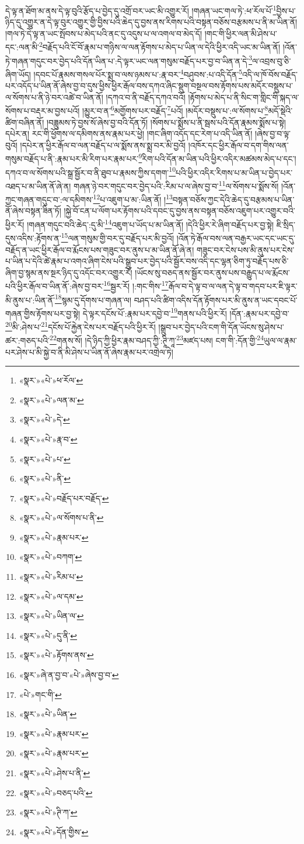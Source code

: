 དེ་ལྟ་ན་ཐོག་མ་ནས་དེ་ལྟ་བུའི་རྩོད་པ་བྱེད་དུ་འགྲོ་བར་ཡང་མི་འགྱུར་རོ། །གཞན་ཡང་གལ་ཏེ་:ཕ་རོལ་པོ་\footnote{«སྣར་»«པེ་»ཕ་རོལ་}བྱིས་པ་ཉིད་དུ་འགྱུར་ན་དེ་ལྟ་བུར་འགྱུར་གྱི་བྱིས་པའི་ཆེད་དུ་བྱས་ནས་རིགས་པའི་བསྟན་བཅོས་བརྩམས་པ་ནི་མ་ཡིན་ནོ། །གལ་ཏེ་དེ་ལྟ་ན་ཡང་སྤོབས་པ་མེད་པའི་ནང་དུ་འདུས་པ་ལ་འགལ་བ་མེད་དོ། །གང་གི་ཕྱིར་ལན་མི་ཤེས་པ་དང་:ལན་མི་\footnote{«སྣར་»«པེ་»ལན་མ་}བརྗོད་པའི་ངོ་བོ་རྣམ་པ་གཉིས་ལ་ལན་རྟོགས་པ་མེད་པ་ཡིན་ལ་དེའི་ཕྱིར་འདི་ཡང་མ་ཡིན་ནོ། །འོན་ཏེ་གཞན་གདུང་བར་བྱེད་པའི་དོན་ཡིན་པ་:དེ་ལྟར་ཡང་ལན་གསུམ་བརྗོད་པར་བྱ་བ་ཡིན་ན་དེ་\footnote{«སྣར་»«པེ་»དེ་}ལ་འབྲས་བུ་ཅི་ཞིག་ཡོད། །དབང་པོ་རྣམས་གསལ་པོར་སྨྲ་བ་ལས་ཉམས་པ་:རྣ་བར་\footnote{«སྣར་»«པེ་»རྣ་བ་}བཤུབས་:པ་འདི་དོན་\footnote{«སྣར་»«པེ་»པ་}འདི་ལ་ཁོ་བོས་བརྗོད་པར་འདོད་པ་ཡིན་ནོ་ཞེས་བྱ་བ་དུས་ཕྱིས་ཕྱིར་རྒོལ་བས་དཀའ་ཞིང་སྡུག་བསྔལ་བས་རྟོགས་པས་མདོར་བསྡུས་པ་ལ་སོགས་པ་ནི་ཉེ་བར་འཚེ་བ་ཡིན་ནོ། །དཀའ་བ་ནི་བརྗོད་དཀའ་བའོ། །རྟོགས་པ་མེད་པ་ནི་སིང་ག་གླིང་གི་སྐད་ལ་སོགས་པ་བརྡར་མ་བྱས་པའོ། །མྱུར་བ་ན་\footnote{«སྣར་»«པེ་»ནི་}མགྱོགས་པར་བརྗོད་\footnote{«སྣར་»«པེ་»བརྗོད་པར་བརྗོད་}པའོ། །མདོར་བསྡུས་པ་:ལ་སོགས་པ་\footnote{«སྣར་»«པེ་»ལ་སོགས་པ་ནི་}མདོ་སྡེའི་ཚིག་བཞིན་ནོ། །བཟླུམས་ཏེ་བྱས་སོ་ཞེས་བྱ་བའི་དོན་ཏོ། །སོགས་པ་སྨོས་པ་ནི་སྦས་པའི་དོན་རྣམས་སྨོས་པ་སྟེ། དཔེར་ན། རང་གི་ཕྱོགས་ལ་དམིགས་ནས་རྣམ་པར་ཕྱེ། །གང་ཞིག་འདོད་དང་རེག་པ་འདི་ཡིན་ནོ། །ཞེས་བྱ་བ་ལྟ་བུའོ། །དཔེར་ན་ཕྱིར་རྒོལ་བ་ལན་བརྗོད་པ་ལ་སྨོས་ནས་སྨྲ་བར་མི་བྱའོ། །འཁོར་དང་ཕྱིར་རྒོལ་བ་དག་གིས་ལན་གསུམ་བརྗོད་པ་ནི་:རྣམ་པར་མི་རིག་པར་རྣམ་པར་\footnote{«སྣར་»«པེ་»རྣམ་པར་}རིག་པའི་དོན་མ་ཡིན་པའི་ཕྱིར་འདིར་མཚམས་མེད་པ་དང་། དཀའ་བ་ལ་སོགས་པའི་སྒྲ་སྦྱོར་བ་ནི་ཐུབ་པ་རྣམས་ཀྱིས་དགག་\footnote{«སྣར་»«པེ་»བཀག་}པའི་ཕྱིར་འདིར་རིགས་པ་མ་ཡིན་པ་བྱེད་པར་འཐད་པ་མ་ཡིན་ནོ་ཞེ་ན། གཞན་ཉེ་བར་གདུང་བར་བྱེད་པའི་:རིམ་པ་ལ་ཞེས་བྱ་བ་\footnote{«སྣར་»«པེ་»རིམ་པ་}ལ་སོགས་པ་སྨོས་སོ། །འོན་ཀྱང་གཞན་གདུང་བ་:ལ་དམིགས་\footnote{«སྣར་»«པེ་»ལ་དམ་}པ་འཇུག་པ་མ་:ཡིན་ནོ། །\footnote{«སྣར་»«པེ་»ཡིན་ལ་}བསྟན་བཅོས་ཀྱང་དེའི་ཆེད་དུ་བརྩམས་པ་ཡིན་ནོ་ཞེས་བསྟན་ཟིན་ཏོ། །སྐྱེ་བོ་ངན་པ་ལོག་པར་རྟོགས་པའི་དབང་དུ་བྱས་ནས་བསྟན་བཅོས་འཇུག་པར་འགྱུར་བའི་ཕྱིར་རོ། །གཞན་གདུང་བའི་ཆེད་:དུ་མི་\footnote{«སྣར་»«པེ་»དུ་ནི་}འཇུག་པ་ཡོད་པ་མ་ཡིན་ནོ། །དེའི་ཕྱིར་རེ་ཞིག་བརྗོད་པར་བྱ་སྟེ། ཇི་སྲིད་དུས་འདིས་:རྟོགས་ན་\footnote{«སྣར་»«པེ་»རྟོགས་ནས་}ལན་གསུམ་གྱི་བར་དུ་བརྗོད་པར་མི་བྱའོ། །འོན་ཏེ་རྒོལ་བས་ལན་བརྒྱར་ཡང་དང་ཡང་དུ་བརྗོད་ན་ཡང་ཕྱིར་རྒོལ་བ་རྨོངས་པས་གཟུང་བར་ནུས་པ་མ་ཡིན་ནོ་ཞེ་ན། གཟུང་བར་ངེས་པས་མི་ནུས་པར་ངེས་པ་ཡིན་པ་དེའི་ཚེ་རྣམ་པ་འགའ་ཞིག་ངེས་པའི་སྒྲུབ་པར་བྱེད་པའི་སྦྱོར་བས་འདི་དང་ལྷན་ཅིག་ཏུ་བརྗོད་པས་ཅི་ཞིག་བྱ་སྙམ་ནས་སྔར་ཉིད་དུ་འདོང་བར་འགྱུར་རོ། །ཡོངས་སུ་བཅད་ནས་སྦྱོར་བར་ནུས་པས་བརྒྱུད་པ་ལ་རྨོངས་པའི་ཕྱིར་རྒོལ་བ་ཡིན་ནོ་:ཞེས་བྱ་བར་\footnote{«སྣར་»ཞེ་ན་བྱ་བ་«པེ་»ཞེས་བྱ་བ་}སྦྱར་རོ། །:གང་གིས་\footnote{«པེ་»གང་གི་}རྒོལ་བ་དེ་ལྟ་བ་ལ་ལན་དེ་ལྟ་བ་གདབ་པར་ཇི་ལྟར་མི་ནུས་པ་:ཡིན་ནོ་\footnote{«སྣར་»«པེ་»ཡིན་}སྙམ་དུ་དོགས་པ་གཞན་ལ། བཤད་པའི་ཚིག་འདིས་དོན་རྟོགས་པར་མི་ནུས་ན་ཡང་དབང་པོ་གཞན་གྱིས་རྟོགས་པར་བྱ་སྟེ། དེ་ལྟར་དངོས་པོ་:རྣམ་པར་དབྱེ་བ་\footnote{«སྣར་»«པེ་»རྣམ་པར་}གནས་པའི་ཕྱིར་རོ། །དོན་:རྣམ་པར་དབྱེ་བ་\footnote{«སྣར་»«པེ་»རྣམ་པར་}མི་:ཤེས་པ་\footnote{«སྣར་»«པེ་»ཤེས་པ་ནི་}དངོས་པོ་རྐྱེན་ངེས་པར་བརྗོད་པའི་ཕྱིར་རོ། །སྒྲུབ་པར་བྱེད་པའི་ངག་གི་དོན་ཡོངས་སུ་ཤེས་པ་ཚར་:གཅད་པའི་\footnote{«སྣར་»«པེ་»བཅད་པའི་}གནས་སོ། །དེ་ཉིད་ཀྱི་ཕྱིར་རྣམ་བཤད་ཀྱི་:ཊཱི་ཀཱ་\footnote{«སྣར་»«པེ་»ཊི་ཀ་}མཛད་པས། ངག་གི་:དོན་གྱི་\footnote{«སྣར་»«པེ་»དོན་གྱིས་}ཡུལ་ལ་རྣམ་པར་ཤེས་པ་མི་སྐྱེ་བ་ནི་མི་ཤེས་པ་ཡིན་ནོ་ཞེས་རྣམ་པར་འགྲེལ་ཏེ། 